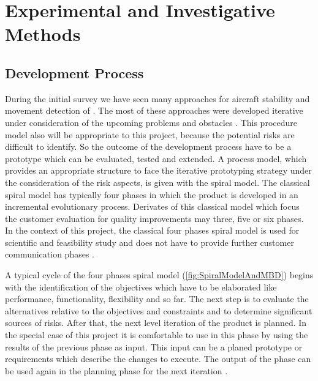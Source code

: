 \chapter{Experimental and Investigative Methods}

\section{Development Process}

During the initial survey we have seen many approaches for aircraft stability and
movement detection of \UAV. The most of these approaches were developed
iterative under consideration of the upcoming problems and obstacles 
. This procedure model also will be appropriate to this project, because the potential risks are difficult to identify. So the outcome of the development process have to be a
prototype which can be evaluated, tested and extended. A process model, which
provides an appropriate structure to face the iterative prototyping strategy
under the consideration of the risk aspects, is given with the spiral model. The
classical spiral model has typically four phases in which the product is
developed in an incremental evolutionary process. Derivates of this classical
model which focus the customer evaluation for quality improvements may three,
five or six phases. In the context of this project, the classical four phases
spiral model is used for scientific and feasibility study and does not have to
provide further customer communication phases
.

\newpage
A typical cycle of the four phases spiral model (\ref{fig:SpiralModelAndMBD})
 begins with the identification of
the objectives which have to be elaborated like performance,
functionality, flexibility and so far. The next step is to evaluate the
alternatives relative to the objectives and constraints and to determine
significant sources of risks. After that, the next level
iteration of the product is planned. In the special case of this project it is
comfortable to use \MBD in this phase by using the results of the previous phase as input.
This input can be a planed prototype or requirements which describe the changes
to execute. The output of the \MBD phase can be used again in the planning phase
for the next iteration .


